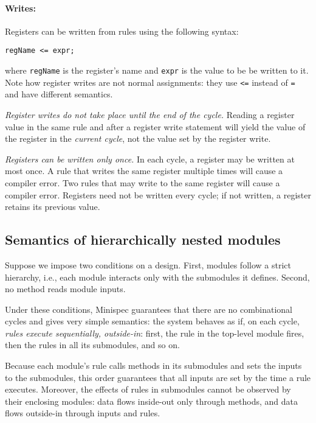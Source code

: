 \paragraph{Writes:}
Registers can be written from rules using the following syntax:
\begin{center}
\verb|regName <= expr;|
\end{center}
where \verb|regName| is the register's name and \verb|expr| is the value to be be written to it.
Note how register writes are not normal assignments: they use \verb|<=| instead of \verb|=|
and have different semantics.

\emph{Register writes do not take place until the end of the cycle.}
Reading a register value in the same rule and after a register write statement
will yield the value of the register in the  \emph{current cycle},
not the value set by the register write.

\emph{Registers can be written only once.}
In each cycle, a register may be written at most once.
A rule that writes the same register multiple times will cause a compiler error.
Two rules that may write to the same register will cause a compiler error.
Registers need not be written every cycle; if not written, a register retains its previous value.


\subsection{Semantics of hierarchically nested modules}
\label{sec:basicmodsemantics}

Suppose we impose two conditions on a design.
First, modules follow a strict hierarchy,
i.e., each module interacts only with the submodules it defines.
Second, no method reads module inputs.

Under these conditions, Minispec guarantees that there are no combinational cycles and gives very simple semantics:
the system behaves as if, on each cycle, \emph{rules execute sequentially, outside-in}:
first, the rule in the top-level module fires,
then the rules in all its submodules, and so on.

Because each module's rule calls methods in its submodules and sets the inputs to the submodules,
this order guarantees that all inputs are set by the time a rule executes.
Moreover, the effects of rules in submodules cannot be observed
by their enclosing modules: data flows inside-out only through methods,
and data flows outside-in through inputs and rules.

